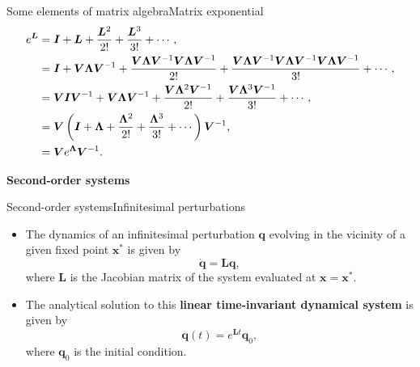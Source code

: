 \documentclass[usenames,dvipsnames,svgnames,10pt,aspectratio=169]{beamer}
\begin{document}
\begin{frame}[t, c]{Some elements of matrix algebra}{Matrix exponential}
	\begin{equation}
		\begin{aligned}
			e^{\bm L} & = {\bm I} + {\bm L} + \displaystyle \frac{{\bm L}^2}{2!} + \frac{{\bm L}^3}{3!} + \cdots, \\
			& = {\bm I} + {\bm V}{\boldsymbol \Lambda}{\bm V}^{-1} + \displaystyle \frac{{\bm V}{\boldsymbol \Lambda}{\bm V}^{-1}{\bm V}{\boldsymbol \Lambda}{\bm V}^{-1}}{2!} + \frac{{\bm V}{\boldsymbol \Lambda}{\bm V}^{-1}{\bm V}{\boldsymbol \Lambda}{\bm V}^{-1}{\bm V}{\boldsymbol \Lambda}{\bm V}^{-1}}{3!} + \cdots, \\
			& = {\bm V}{\bm I}{\bm V}^{-1} + {\bm V}{\boldsymbol \Lambda}{\bm V}^{-1} + \displaystyle \frac{{\bm V}{\boldsymbol \Lambda}^2{\bm V}^{-1}}{2!} + \frac{{\bm V}{\boldsymbol \Lambda}^3{\bm V}^{-1}}{3!} + \cdots, \\
			& = {\bm V} \left( {\bm I} + {\boldsymbol \Lambda} + \displaystyle \frac{{\boldsymbol \Lambda}^2}{2!} + \frac{{\boldsymbol \Lambda}^3}{3!} + \cdots \right){\bm V}^{-1}, \\
			& = {\bm V} e^{\boldsymbol \Lambda} {\bm V}^{-1}.
		\end{aligned}
		\notag
	\end{equation}

	\vspace{1cm}
\end{frame}

\begin{frame}[t, c]{}
	\centering
	\vspace{1cm}

	{\Large \textbf{Second-order systems}}

	\bigskip

	{}

\end{frame}

\begin{frame}[t, c]{Second-order systems}{Infinitesimal perturbations}
	\begin{itemize}
		\item The dynamics of an infinitesimal perturbation ${\bm q}$ evolving in the vicinity of a given fixed point ${\bm x}^*$ is given by
		$$\dot{\bm q} = {\bm L}{\bm q},$$
		where ${\bm L}$ is the Jacobian matrix of the system evaluated at ${\bm x} = {\bm x}^*$.

		\bigskip

		\item The analytical solution to this \alert{\textbf{linear time-invariant dynamical system}} is given by
		$${\bm q}(t) = e^{{\bm L}t}{\bm q}_0,$$
		where ${\bm q}_0$ is the initial condition.
	\end{itemize}

	\vspace{1cm}
\end{frame}
\end{document}
